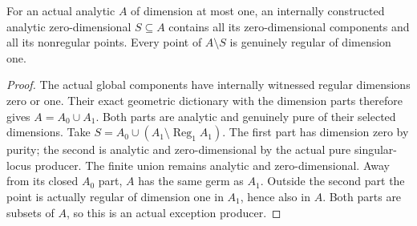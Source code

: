 \begin{lemma}
\label{hir:curve-predicates-singular-envelope}
\leanok
For an actual analytic $A$ of dimension at most one, an internally
constructed analytic zero-dimensional $S\subseteq A$ contains all its
zero-dimensional components and all its nonregular points. Every point
of $A\setminus S$ is genuinely regular of dimension one.
\end{lemma}
\begin{proof}
The actual global components have internally witnessed regular dimensions
zero or one. Their exact geometric dictionary with the dimension parts
therefore gives $A=A_0\cup A_1$. Both parts are analytic and genuinely pure
of their selected dimensions. Take $S=A_0\cup(A_1\setminus\operatorname{Reg}_1 A_1)$.
The first part has dimension zero by purity; the second is analytic and
zero-dimensional by the actual pure singular-locus producer. The finite
union remains analytic and zero-dimensional. Away from its closed $A_0$
part, $A$ has the same germ as $A_1$. Outside the second part the point is
actually regular of dimension one in $A_1$, hence also in $A$. Both parts
are subsets of $A$, so this is an actual exception producer.
\end{proof}

